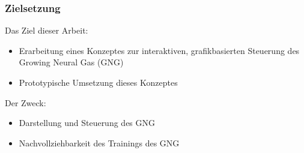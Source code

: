 \begin{frame}
    \frametitle{Zielsetzung}
    Das Ziel dieser Arbeit:
    \begin{itemize}
        \item Erarbeitung eines Konzeptes zur interaktiven, grafikbasierten Steuerung des Growing Neural Gas (GNG)
        \item Prototypische Umsetzung dieses Konzeptes
    \end{itemize}
    Der Zweck:
    \begin{itemize}
        \item Darstellung und Steuerung des GNG
        \item Nachvollziehbarkeit des Trainings des GNG
    \end{itemize}
\end{frame}
